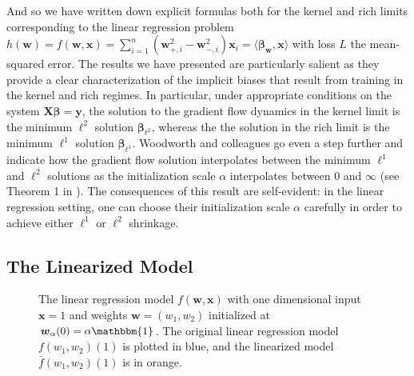 \documentclass{article}
\begin{document}
And so we have written down explicit formulas both for the kernel and rich limits corresponding to the linear regression problem $h(\boldsymbol{w}) = f(\boldsymbol{w}, \boldsymbol{x}) = \sum_{i=1}^n(\boldsymbol{w}_{+, i}^2 - \boldsymbol{w}_{-, i}^2)\boldsymbol{x}_i = \langle \boldsymbol{\beta}_{\boldsymbol{w}}, \boldsymbol{x} \rangle $ with loss $L$ the mean-squared error. The results we have presented are particularly salient as they provide a clear characterization of the implicit biases that result from training in the kernel and rich regimes. In particular, under appropriate conditions on the system $\boldsymbol{X} \boldsymbol{\beta} = \boldsymbol{y}$, the solution to the gradient flow dynamics in the kernel limit is the minimum $\ell^2$ solution $\boldsymbol{\beta}_{\ell^2}$, whereas the the solution in the rich limit is the minimum $\ell^1$ solution $\boldsymbol{\beta}_{\ell^1}$. Woodworth and colleagues go even a step further and indicate how the gradient flow solution interpolates between the minimum $\ell^1$ and $\ell^2 $ solutions as the initialization scale $\alpha$ interpolates between $0$ and $\infty$ (see Theorem 1 in \cite{woodworth2020kernel}). The consequences of this result are self-evident: in the linear regression setting, one can choose their initialization scale $\alpha$ carefully in order to achieve either $\ell^1$ or $\ell^2$ shrinkage.

\subsection{The Linearized Model}

\begin{figure}[H]
    \centering
    \hfill
    \caption{The linear regression model $f(\boldsymbol{w}, \boldsymbol{x})$ with one dimensional input $\boldsymbol{x} = 1$ and weights $\boldsymbol{w} = (w_1, w_2)$ initialized at $\boldsymbol{w}_{\alpha}(0) = \alpha \mathbbm{1}$. The original linear regression model $f(w_1, w_2)(1)$ is plotted in blue, and the linearized model $\bar{f}(w_1, w_2)(1)$ is in orange.}\label{img:linearization}
\end{figure}
\end{document}
